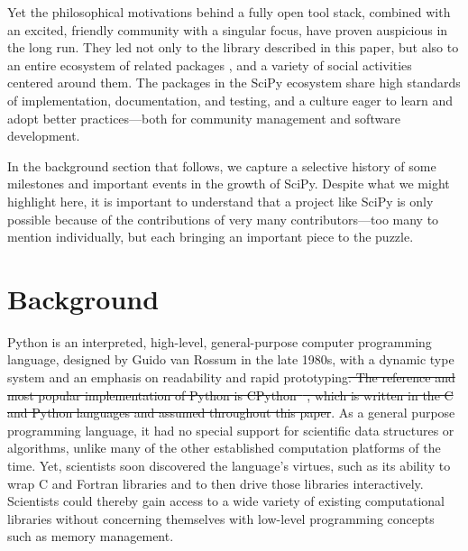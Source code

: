 \documentclass[fleqn,10pt]{wlscirep}
\providecommand{\DIFadd}[1]{{\protect\color{blue}\uwave{#1}}} %
\providecommand{\DIFdel}[1]{{\protect\color{red}\sout{#1}}}                      %
\providecommand{\DIFaddbegin}{} %
\providecommand{\DIFaddend}{} %
\providecommand{\DIFdelbegin}{} %
\providecommand{\DIFdelend}{} %
\begin{document}
Yet the philosophical motivations behind a fully open tool stack, combined
with an excited, friendly community with a singular focus, have
proven auspicious in the long run.  They led not only to the library
described in this paper, but also to an entire ecosystem of related
packages \cite{scipy-ecosystem}, and a variety of social activities centered around
them\cite{social-python}. The packages in the SciPy ecosystem
share high standards of implementation,
documentation, and testing, and a culture eager to learn and adopt
better practices---both for community management and software
development.


In the background section that follows, we capture a selective history
of some milestones and important events in the growth of SciPy.
Despite what we might highlight here, it is important to understand
that a project like SciPy is only possible because of the
contributions of very many contributors---too many to mention
individually, but each bringing an important piece to the puzzle.

\section*{Background}

Python is an interpreted, high-level, general-purpose computer programming
language, designed by Guido van Rossum in the late 1980s,
with a dynamic type system and an emphasis on readability and rapid prototyping\DIFdelbegin \DIFdel{.
The reference and most popular implementation of Python is
CPython\mbox{%
\cite{cpython-refman,cpython-source}}\hspace{0pt}%
, which is written
in the C and Python languages and assumed throughout this paper}\DIFdelend \DIFaddbegin \DIFadd{\mbox{%
\cite{cpython-refman,cpython-source}}\hspace{0pt}%
}\DIFaddend .
As a general purpose programming language, it had no special support for
scientific data structures or algorithms, unlike many of the other established
computation platforms of the time. Yet, scientists soon discovered the
language's virtues, such as its ability to wrap C and Fortran
libraries and to then drive those libraries interactively.  Scientists
could thereby gain access to a wide variety of existing computational
libraries without concerning themselves with low-level programming
concepts such as memory management.
\end{document}
